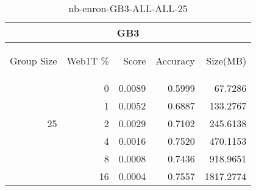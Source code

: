 \begin{center}
\begin{table}[htbp]
\begin{tabular}{ | r | r | r | r | r |}
\hline
\multicolumn{5}{|c|}{GB3}\\
\hline
\begin{sideways}Group Size\end{sideways} & \begin{sideways}Web1T \%\end{sideways} & \begin{sideways}Score\end{sideways} & \begin{sideways}Accuracy\end{sideways} & \begin{sideways}Size(MB)\end{sideways}\\
\hline
\multirow{5}{*}{25}
 & 0 & 0.0089 & 0.5999 & 67.7286\\ \cline{2-5}
 & 1 & 0.0052 & 0.6887 & 133.2767\\ \cline{2-5}
 & 2 & 0.0029 & 0.7102 & 245.6138\\ \cline{2-5}
 & 4 & 0.0016 & 0.7520 & 470.1153\\ \cline{2-5}
 & 8 & 0.0008 & 0.7436 & 918.9651\\ \cline{2-5}
 & 16 & 0.0004 & 0.7557 & 1817.2774\\ \cline{2-5}
\hline
\end{tabular}
\caption{nb-enron-GB3-ALL-ALL-25}
\label{table:nb-enron-GB3-ALL-ALL-25}
\end{table}
\end{center}

